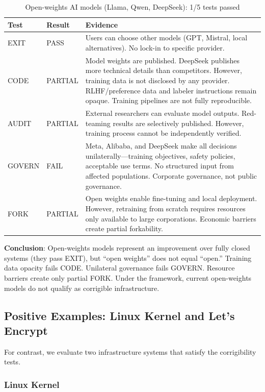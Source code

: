 \documentclass[11pt,a4paper]{article}
\newcommand{\tpass}{\textcolor{passgreen}{PASS}}
\newcommand{\tfail}{\textcolor{failred}{FAIL}}
\newcommand{\tpartial}{\textcolor{partialorange}{PARTIAL}}
\begin{document}
\begin{table}[htbp]
\centering
\begin{tabular}{@{}llp{7cm}@{}}
\toprule
\textbf{Test} & \textbf{Result} & \textbf{Evidence} \\
\midrule
EXIT & \tpass & Users can choose other models (GPT, Mistral, local alternatives). No lock-in to specific provider. \\
\addlinespace
CODE & \tpartial & Model weights are published. DeepSeek publishes more technical details than competitors. However, training data is not disclosed by any provider. RLHF/preference data and labeler instructions remain opaque. Training pipelines are not fully reproducible. \\
\addlinespace
AUDIT & \tpartial & External researchers can evaluate model outputs. Red-teaming results are selectively published. However, training process cannot be independently verified. \\
\addlinespace
GOVERN & \tfail & Meta, Alibaba, and DeepSeek make all decisions unilaterally---training objectives, safety policies, acceptable use terms. No structured input from affected populations. Corporate governance, not public governance. \\
\addlinespace
FORK & \tpartial & Open weights enable fine-tuning and local deployment. However, retraining from scratch requires resources only available to large corporations. Economic barriers create partial forkability. \\
\bottomrule
\end{tabular}
\caption{Open-weights AI models (Llama, Qwen, DeepSeek): 1/5 tests passed}
\end{table}

\textbf{Conclusion}: Open-weights models represent an improvement over fully closed systems (they pass EXIT), but ``open weights'' does not equal ``open.'' Training data opacity fails CODE. Unilateral governance fails GOVERN. Resource barriers create only partial FORK. Under the framework, current open-weights models do not qualify as corrigible infrastructure.

\subsection{Positive Examples: Linux Kernel and Let's Encrypt}

For contrast, we evaluate two infrastructure systems that satisfy the corrigibility tests.

\subsubsection{Linux Kernel}
\end{document}

